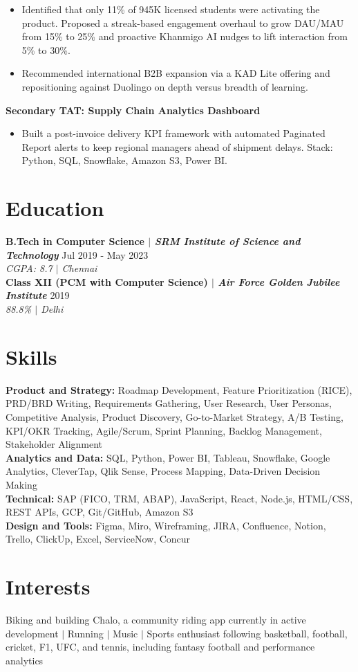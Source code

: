 \documentclass[10pt]{article}
\begin{document}
\vspace{-8pt}
\begin{itemize}
  \item Identified that only 11\% of 945K licensed students were activating the product. Proposed a streak-based engagement overhaul
  to grow DAU/MAU from 15\% to 25\% and proactive Khanmigo AI nudges to lift interaction from 5\% to 30\%.
  \item Recommended international B2B expansion via a KAD Lite offering and repositioning against Duolingo on depth versus
  breadth of learning.
\end{itemize}
\vspace{4pt}
\textbf{Secondary TAT: Supply Chain Analytics Dashboard} \\[-4pt]
\vspace{-8pt}
\begin{itemize}
  \item Built a post-invoice delivery KPI framework with automated Paginated Report alerts to keep regional managers ahead of
  shipment delays. Stack: Python, SQL, Snowflake, Amazon S3, Power BI.
\end{itemize}

\section*{Education}
\textbf{B.Tech in Computer Science $|$ \textit{SRM Institute of Science and Technology}} \hfill Jul 2019 - May 2023 \\
\textit{CGPA: 8.7 $|$ Chennai}\\[4pt]
\textbf{Class XII (PCM with Computer Science) $|$ \textit{Air Force Golden Jubilee Institute}} \hfill 2019 \\
\textit{88.8\% $|$ Delhi}

\section*{Skills}
\textbf{Product and Strategy:} Roadmap Development, Feature Prioritization (RICE), PRD/BRD Writing, Requirements Gathering, User
Research, User Personas, Competitive Analysis, Product Discovery, Go-to-Market Strategy, A/B Testing, KPI/OKR Tracking,
Agile/Scrum, Sprint Planning, Backlog Management, Stakeholder Alignment \\[4pt]
\textbf{Analytics and Data:} SQL, Python, Power BI, Tableau, Snowflake, Google Analytics, CleverTap, Qlik Sense, Process Mapping,
Data-Driven Decision Making \\[4pt]
\textbf{Technical:} SAP (FICO, TRM, ABAP), JavaScript, React, Node.js, HTML/CSS, REST APIs, GCP, Git/GitHub, Amazon S3 \\[4pt]
\textbf{Design and Tools:} Figma, Miro, Wireframing, JIRA, Confluence, Notion, Trello, ClickUp, Excel, ServiceNow, Concur

\section*{Interests}
Biking and building Chalo, a community riding app currently in active development $|$ Running $|$ Music $|$ Sports enthusiast
following basketball, football, cricket, F1, UFC, and tennis, including fantasy football and performance analytics
\end{document}
